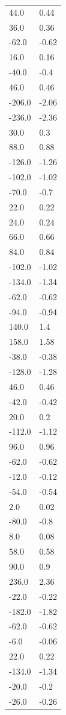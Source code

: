 \begin{longtable}{ll}
44.0 & 0.44 \\
36.0 & 0.36 \\
-62.0 & -0.62 \\
16.0 & 0.16 \\
-40.0 & -0.4 \\
46.0 & 0.46 \\
-206.0 & -2.06 \\
-236.0 & -2.36 \\
30.0 & 0.3 \\
88.0 & 0.88 \\
-126.0 & -1.26 \\
-102.0 & -1.02 \\
-70.0 & -0.7 \\
22.0 & 0.22 \\
24.0 & 0.24 \\
66.0 & 0.66 \\
84.0 & 0.84 \\
-102.0 & -1.02 \\
-134.0 & -1.34 \\
-62.0 & -0.62 \\
-94.0 & -0.94 \\
140.0 & 1.4 \\
158.0 & 1.58 \\
-38.0 & -0.38 \\
-128.0 & -1.28 \\
46.0 & 0.46 \\
-42.0 & -0.42 \\
20.0 & 0.2 \\
-112.0 & -1.12 \\
96.0 & 0.96 \\
-62.0 & -0.62 \\
-12.0 & -0.12 \\
-54.0 & -0.54 \\
2.0 & 0.02 \\
-80.0 & -0.8 \\
8.0 & 0.08 \\
58.0 & 0.58 \\
90.0 & 0.9 \\
236.0 & 2.36 \\
-22.0 & -0.22 \\
-182.0 & -1.82 \\
-62.0 & -0.62 \\
-6.0 & -0.06 \\
22.0 & 0.22 \\
-134.0 & -1.34 \\
-20.0 & -0.2 \\
-26.0 & -0.26 \\

\end{longtable}
